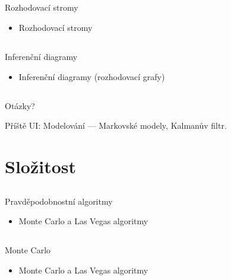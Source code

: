 \documentclass{beamer}
\begin{document}
\subsection{}
\begin{frame}{Rozhodovací stromy}
\begin{itemize}
\item Rozhodovací stromy
\end{itemize}
\end{frame}

\subsection{}
\begin{frame}{Inferenční diagramy}
\begin{itemize}
\item Inferenční diagramy (rozhodovací grafy)
\end{itemize}
\end{frame}

\subsection{}
\begin{frame}{Otázky?}
\begin{center}
Příště UI: Modelování --- Markovské modely, Kalmanův filtr.
\end{center}
\end{frame}

\section{Složitost}

\subsection{}
\begin{frame}{Pravděpodobnostní algoritmy}
\begin{itemize}
\item Monte Carlo a Las Vegas algoritmy
\end{itemize}
\end{frame}

\subsection{}
\begin{frame}{Monte Carlo}
\begin{itemize}
\item Monte Carlo a Las Vegas algoritmy
\end{itemize}
\end{frame}
\end{document}
